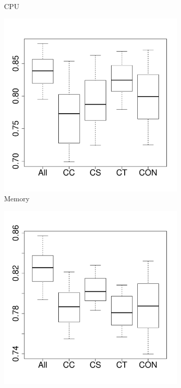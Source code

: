 \begin{figure}[t]
\begin{subfigure}{0.19\textwidth}
                \caption{CPU}
        \end{subfigure}%
        \begin{subfigure}{0.19\textwidth}
                \includegraphics[width=\linewidth]{Figures/mem-cassandraremove-importance.pdf}
                \caption{Memory}
        \end{subfigure}%
        \begin{subfigure}{0.19\textwidth}
                \includegraphics[width=\linewidth]{Figures/ioread-cassandraremove-importance.pdf}

\end{subfigure}
\end{figure}
